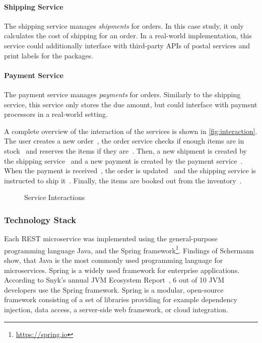 \paragraph{Shipping Service}

The shipping service manages \textit{shipments} for orders.
In this case study, it only calculates the cost of shipping for an order.
In a real-world implementation, this service could additionally interface with third-party \acp{API} of postal services and print labels for the packages.

\paragraph{Payment Service}

The payment service manages \textit{payments} for orders.
Similarly to the shipping service, this service only stores the due amount, but could interface with payment processors in a real-world setting.


A complete overview of the interaction of the services is shown in \autoref{fig:interaction}.
The user creates a new order~, the order service checks if enough items are in stock~ and reserves the items if they are~.
Then, a new shipment is created by the shipping service~ and a new payment is created by the payment service~.
When the payment is received~, the order is updated~ and the shipping service is instructed to ship it~.
Finally, the items are booked out from the inventory~.

\begin{figure}[!htb]
    \centering
    
    \caption{Service Interactions}\label{fig:interaction}
\end{figure}

\subsubsection{Technology Stack}

Each \acs{REST} microservice was implemented using the general-purpose programming language Java, and the Spring framework\footnote{\url{https://spring.io}}.
Findings of Schermann~\cite{Schermann2015} show, that Java is the most commonly used programming language for microservices.
Spring is a widely used framework for enterprise applications.
According to Snyk's annual \acs{JVM} Ecosystem Report~\cite{Vermeer2020}, 6 out of 10 \acs{JVM} developers use the Spring framework.
Spring is a modular, open-source framework consisting of a set of libraries providing for example dependency injection, data access, a server-side web framework, or cloud integration.

